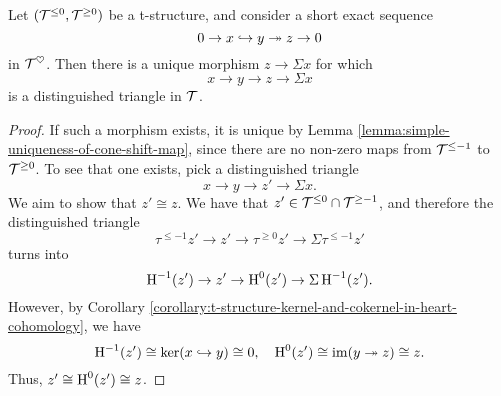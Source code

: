 \begin{corollary}\label{corollary:t-structure-exact-sequence-in-heart-induces-unique-distinguished-triangle}
	Let \((\mathcal{T}^{\leq 0},\mathcal{T}^{\geq 0})\) be a t-structure, and consider a short exact sequence
	\[ 0 \to x \hookrightarrow y \twoheadrightarrow z \to 0 \]
	in \(\mathcal{T}^\heartsuit\). Then there is a unique morphism \(z \to \Sigma x\) for which
	\[ x \to y \to z \to \Sigma x \]
	is a distinguished triangle in \(\mathcal{T}\).
\end{corollary}
\begin{proof}
If such a morphism exists, it is unique by Lemma \ref{lemma:simple-uniqueness-of-cone-shift-map}, since there are no non-zero maps from \(\mathcal{T}^{\leq -1}\) to \(\mathcal{T}^{\geq 0}\). To see that one exists,
pick a distinguished triangle
\[ x \to y \to z' \to \Sigma x. \]
We aim to show that \(z' \cong z\). We have that \(z'\in\mathcal{T}^{\leq 0}\cap\mathcal{T}^{\geq -1}\), and therefore the distinguished triangle
\[ \tau^{\leq -1}z' \to z' \to \tau^{\geq 0}z' \to \Sigma\tau^{\leq -1}z' \]
turns into
\[ \operatorname{H}^{-1}(z') \to z' \to \operatorname{H}^0(z') \to \Sigma \operatorname{H}^{-1}(z'). \]
However, by Corollary \ref{corollary:t-structure-kernel-and-cokernel-in-heart-cohomology}, we have
\[ \operatorname{H}^{-1}(z') \cong \ker(x\hookrightarrow y) \cong 0,\quad \operatorname{H}^0(z')\cong \operatorname{im}(y\twoheadrightarrow z) \cong z. \]
Thus, \(z' \cong \operatorname{H}^0(z') \cong z\).
\end{proof}

